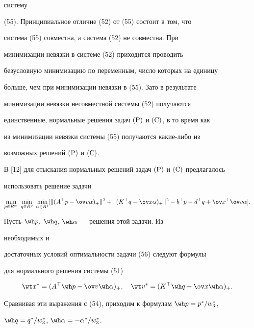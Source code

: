систему


(55). Принципиальное отличие (52) от (55) состоит в том, что


система (55) совместна, а система (52) не совместна. При


минимизации невязки в системе (52) приходится проводить


безусловную минимизацию по переменным, число которых на единицу


больше, чем при минимизации невязки в (55). Зато в результате


минимизации невязки несовместной системы (52) получаются


единственные, нормальные решения задач $(\mathrm P)$ и $(\mathrm C)$, в то время как


из минимизации невязки системы (55) получаются какие-либо из


возможных решений $(\mathrm P)$ и $(\mathrm C)$.





В [12] для отыскания нормальных решений задач $(\mathrm P)$ и $(\mathrm C)$ предлагалось


использовать решение задачи


\begin{equation}


\min_{p\in R^m}\;\min_{q\in R^\nu}\;\min_{\alpha\in R^1}


[\|(A^\top p-\ov v\alpha)_+\|^2+


\|(K^\top q-\ov x\alpha)_+\|^2-


b^\top p-d^\top q+\ov x^\top\ov v\alpha].


\end{equation}


Пусть $\wh p$, $\wh q$, $\wh\alpha$ --- решения этой задачи. Из 


необходимых и


достаточных условий оптимальности задачи (56) следуют формулы


для нормального решения системы (51)


$$


\wt x^*=(A^\top\wh p-\ov v\wh\alpha)_+,\quad


\wt v^*=(K^\top\wh q-\ov x\wh\alpha)_+.


$$


Сравнивая эти выражения с (54), приходим к формулам $\wh p=p^*/w^*_3$, 


$\wh q=q^*/w^*_3$, $\wh\alpha=-\alpha^*/w^*_3$.





